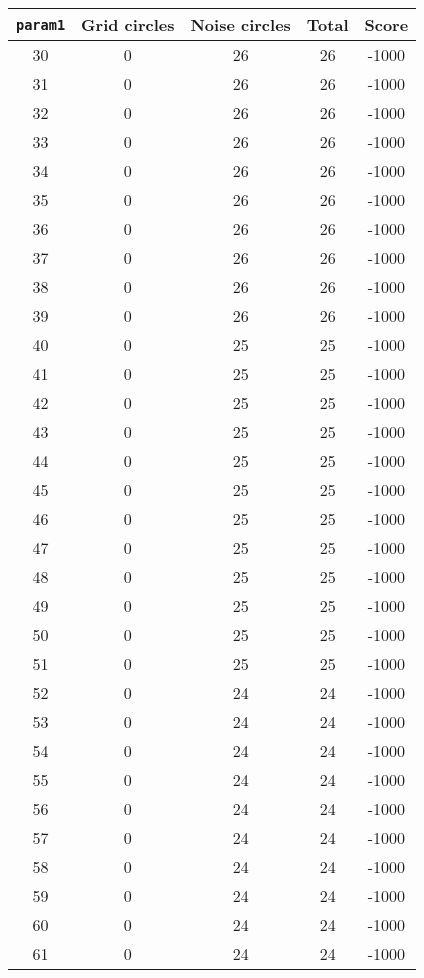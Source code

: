 \documentclass[letterpaper, 12pt]{article}
\begin{document}
\begin{longtable}{|c|c|c|c|c|}
\hline
\textbf{\texttt{param1}} & \textbf{Grid circles} & \textbf{Noise circles} & \textbf{Total} & \textbf{Score} \\
\hline
30 & 0 & 26 & 26 & -1000 \\
\hline
31 & 0 & 26 & 26 & -1000 \\
\hline
32 & 0 & 26 & 26 & -1000 \\
\hline
33 & 0 & 26 & 26 & -1000 \\
\hline
34 & 0 & 26 & 26 & -1000 \\
\hline
35 & 0 & 26 & 26 & -1000 \\
\hline
36 & 0 & 26 & 26 & -1000 \\
\hline
37 & 0 & 26 & 26 & -1000 \\
\hline
38 & 0 & 26 & 26 & -1000 \\
\hline
39 & 0 & 26 & 26 & -1000 \\
\hline
40 & 0 & 25 & 25 & -1000 \\
\hline
41 & 0 & 25 & 25 & -1000 \\
\hline
42 & 0 & 25 & 25 & -1000 \\
\hline
43 & 0 & 25 & 25 & -1000 \\
\hline
44 & 0 & 25 & 25 & -1000 \\
\hline
45 & 0 & 25 & 25 & -1000 \\
\hline
46 & 0 & 25 & 25 & -1000 \\
\hline
47 & 0 & 25 & 25 & -1000 \\
\hline
48 & 0 & 25 & 25 & -1000 \\
\hline
49 & 0 & 25 & 25 & -1000 \\
\hline
50 & 0 & 25 & 25 & -1000 \\
\hline
51 & 0 & 25 & 25 & -1000 \\
\hline
52 & 0 & 24 & 24 & -1000 \\
\hline
53 & 0 & 24 & 24 & -1000 \\
\hline
54 & 0 & 24 & 24 & -1000 \\
\hline
55 & 0 & 24 & 24 & -1000 \\
\hline
56 & 0 & 24 & 24 & -1000 \\
\hline
57 & 0 & 24 & 24 & -1000 \\
\hline
58 & 0 & 24 & 24 & -1000 \\
\hline
59 & 0 & 24 & 24 & -1000 \\
\hline
60 & 0 & 24 & 24 & -1000 \\
\hline
61 & 0 & 24 & 24 & -1000 \\

\end{longtable}
\end{document}
